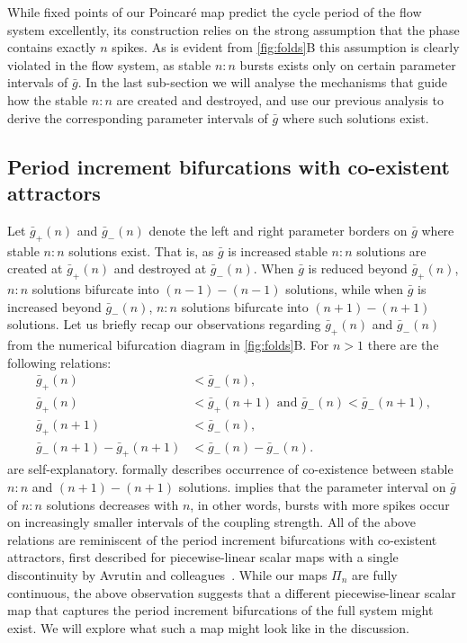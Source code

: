 While fixed points of our Poincaré map predict the cycle period of the flow system excellently, its construction relies on the strong assumption that the \free{} phase contains exactly $n$ spikes.
As is evident from \cref{fig:folds}B this assumption is clearly violated in the flow system, as stable $n:n$ bursts exists only on certain parameter intervals of $\bar g$.
In the last sub-section we will analyse the mechanisms that guide how the stable $n:n$ are created and destroyed, and use our previous analysis to derive the corresponding parameter intervals of $\bar g$ where such solutions exist.

\subsection{Period increment bifurcations with co-existent attractors}
Let $\bar g_+(n)$ and $\bar g_-(n)$ denote the left and right parameter borders on $\bar g$ where stable $n:n$ solutions exist.
That is, as $\bar g$ is increased stable $n:n$ solutions are created at $\bar g_+(n)$ and destroyed at $\bar g_-(n)$.
When $\bar g$ is reduced beyond $\bar g_+(n)$, $n:n$ solutions bifurcate into $(n-1)-(n-1)$ solutions, while when $\bar g$ is increased beyond $\bar g_-(n)$, $n:n$ solutions bifurcate into $(n+1)-(n+1)$ solutions.
Let us briefly recap our observations regarding $\bar g_+(n)$ and $\bar g_-(n)$ from the numerical bifurcation diagram in \cref{fig:folds}B.
For $n>1$ there are the following relations:
\begin{align}
	\bar g_+(n)                   & < \bar g_-(n)\label{eq:easy1},                                         \\
	\bar g_+(n)                   & < \bar g_+(n+1)\text{ and } \bar g_-(n)<\bar g_-(n+1)\label{eq:easy2}, \\
	\bar g_+(n+1)                 & < \bar g_-(n)\label{eq:coexistence},                                   \\
	\bar g_-(n+1) - \bar g_+(n+1) & < \bar g_-(n) - \bar g_-(n)\label{eq:robustness}.
\end{align}
 are self-explanatory.
 formally describes occurrence of co-existence between stable $n:n$ and $(n+1)-(n+1)$ solutions.
 implies that the parameter interval on $\bar g$ of $n:n$ solutions decreases with $n$, in other words, bursts with more spikes occur on increasingly smaller intervals of the coupling strength.
All of the above relations are reminiscent of the period increment bifurcations with co-existent attractors, first described for piecewise-linear scalar maps with a single discontinuity by Avrutin and colleagues~\cite[e.g.
	see][]{gardini2012,tramontana2012,avrutin2011,gardini2012}.
While our maps $\Pi_n$ are fully continuous, the above observation suggests that a different piecewise-linear scalar map that captures the period increment bifurcations of the full system might exist.
We will explore what such a map might look like in the discussion.

